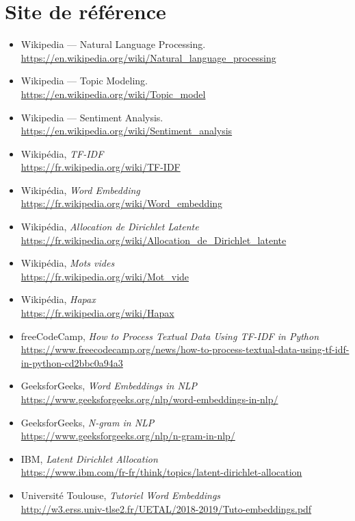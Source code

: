 \documentclass[12pt,a4paper]{report}
\begin{document}
\section*{Site de référence}
\begin{itemize}
  \item Wikipedia — Natural Language Processing.\\
    \url{https://en.wikipedia.org/wiki/Natural_language_processing}
  \item Wikipedia — Topic Modeling.\\
    \url{https://en.wikipedia.org/wiki/Topic_model}
  \item Wikipedia — Sentiment Analysis.\\
    \url{https://en.wikipedia.org/wiki/Sentiment_analysis}
  \item Wikipédia, \textit{TF-IDF}\\
    \url{https://fr.wikipedia.org/wiki/TF-IDF}
  \item Wikipédia, \textit{Word Embedding}\\
    \url{https://fr.wikipedia.org/wiki/Word_embedding}
  \item Wikipédia, \textit{Allocation de Dirichlet Latente}\\
    \url{https://fr.wikipedia.org/wiki/Allocation_de_Dirichlet_latente}
  \item Wikipédia, \textit{Mots vides}\\
    \url{https://fr.wikipedia.org/wiki/Mot_vide}
  \item Wikipédia, \textit{Hapax}\\
    \url{https://fr.wikipedia.org/wiki/Hapax}
  \item freeCodeCamp, \textit{How to Process Textual Data Using TF-IDF in Python}\\
    \url{https://www.freecodecamp.org/news/how-to-process-textual-data-using-tf-idf-in-python-cd2bbc0a94a3}
  \item GeeksforGeeks, \textit{Word Embeddings in NLP}\\
    \url{https://www.geeksforgeeks.org/nlp/word-embeddings-in-nlp/}
  \item GeeksforGeeks, \textit{N-gram in NLP}\\
    \url{https://www.geeksforgeeks.org/nlp/n-gram-in-nlp/}
  \item IBM, \textit{Latent Dirichlet Allocation}\\
    \url{https://www.ibm.com/fr-fr/think/topics/latent-dirichlet-allocation}
  \item Université Toulouse, \textit{Tutoriel Word Embeddings}\\
    \url{http://w3.erss.univ-tlse2.fr/UETAL/2018-2019/Tuto-embeddings.pdf}
\end{itemize}
\end{document}
